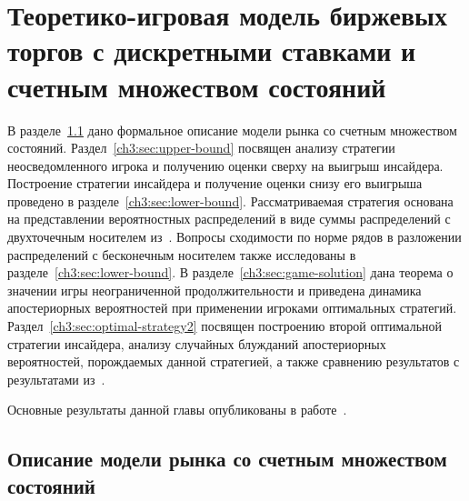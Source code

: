 \chapter{Теоретико-игровая модель биржевых торгов с дискретными ставками и счетным множеством состояний} \label{chapt3}
{
\newcommand{\as}[1][\beta]{\ensuremath{a^{s,#1}}}
\newcommand{\s}{\ensuremath{s}}
\newcommand{\q}{\ensuremath{\overbar{q}}}
\newcommand{\theG}[1][n]{\ensuremath{G^\beta_{#1}}}
\newcommand{\K}[1][n]{\ensuremath{K^\beta_{#1}}}
\newcommand{\V}[1][n]{\ensuremath{V^\beta_{#1}}}
\newcommand{\High}[1][\ensuremath{\infty}]{\ensuremath{H^\beta_{#1}}}
\newcommand{\sigmav}{\ensuremath{\overbar{\sigma}}}
\newcommand{\tauv}{\ensuremath{\overbar{\tau}}}
\newcommand{\xiv}{\ensuremath{\overbar{\xi}}}
\newcommand{\sigmak}{\ensuremath{\hat{\sigma}}}
\newcommand{\Low}[1][\ensuremath{\infty}]{\ensuremath{L^\beta_{#1}}}
\newcommand{\norm}[1]{\left\lVert#1\right\rVert}
\newcommand{\LL}{L^1(\{s^2\})}
\newcommand{\LowV}[1][n]{\ensuremath{\underbar{V}^\beta_{#1}}}
\newcommand{\HighV}[1][n]{\ensuremath{\overbar{V}^\beta_{#1}}}
\newcommand{\MM}{\ensuremath{\overline{P}}}

В разделе~\ref{ch3:sec:intro} дано формальное описание модели рынка со счетным множеством состояний.
Раздел~\ref{ch3:sec:upper-bound} посвящен анализу стратегии неосведомленного игрока и получению оценки сверху на выигрыш инсайдера.
Построение стратегии инсайдера и получение оценки снизу его выигрыша проведено в разделе~\ref{ch3:sec:lower-bound}.
Рассматриваемая стратегия основана на представлении вероятностных распределений в виде суммы распределений с двухточечным носителем из~\cite{domansky11}.
Вопросы сходимости по норме рядов в разложении распределений с бесконечным носителем также исследованы в разделе~\ref{ch3:sec:lower-bound}.
В разделе~\ref{ch3:sec:game-solution} дана теорема о значении игры неограниченной продолжительности и приведена динамика апостериорных вероятностей при применении игроками оптимальных стратегий.
Раздел~\ref{ch3:sec:optimal-strategy2} посвящен построению второй оптимальной стратегии инсайдера, анализу случайных блужданий апостериорных вероятностей, порождаемых данной стратегией, а также сравнению результатов с результатами из~\cite{domansky11}.

Основные результаты данной главы опубликованы в работе~\cite{pyanykh:orm2016}.

\section{Описание модели рынка со счетным множеством состояний}
\label{ch3:sec:intro}

}
